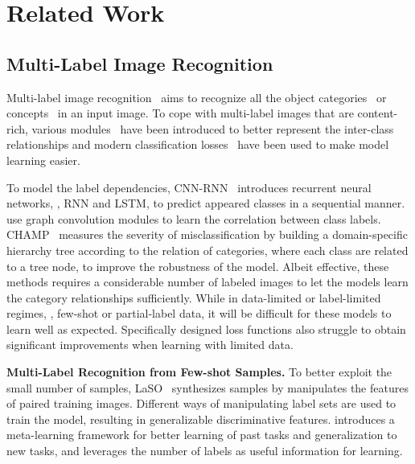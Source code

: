 \documentclass[10pt,twocolumn,letterpaper]{article}
\begin{document}
\section{Related Work}
\label{sec:relatedworks}

\subsection{Multi-Label Image Recognition}
Multi-label image recognition~\cite{ye2020add,benbaruch2020asymmetric,chen2019multi,chen2019multi2,guo2019multi,gao2020multi,zhang2018multilabel,he2018reinforced,wei2015hcp} aims to recognize all the object categories~\cite{coco,voc2007} or concepts~\cite{nuswide} in an input image.
To cope with multi-label images that are content-rich, various modules~\cite{wang2016cnn,chen2019learning} have been introduced to better represent the inter-class relationships and modern classification losses~\cite{benbaruch2020asymmetric,rankingloss} have been used to make model learning easier.

To model the label dependencies, CNN-RNN~\cite{wang2016cnn} introduces recurrent neural networks, \eg, RNN and LSTM, to predict appeared classes in a sequential manner. 
\cite{chen2019multi,chen2019learning,ye2020add,wang2020fast} use graph convolution modules to learn the correlation between class labels.
CHAMP~\cite{vaswani2022all} measures the severity of misclassification by building a domain-specific hierarchy tree according to the relation of categories, where each class are related to a tree node, to improve the robustness of the model.
Albeit effective, these methods requires a considerable number of labeled images to let the models learn the category relationships sufficiently. While in data-limited or label-limited regimes, \eg, few-shot or partial-label data, it will be difficult for these models to learn well as expected. 
Specifically designed loss functions also struggle to obtain significant improvements when learning with limited data.


\noindent \textbf{Multi-Label Recognition from Few-shot Samples.} To better exploit the small number of samples, LaSO~\cite{alfassy2019laso} synthesizes samples by manipulates the features of paired training images. 
Different ways of manipulating label sets are used to train the model, resulting in generalizable discriminative features. \cite{simon2022meta} introduces a meta-learning framework for better learning of past tasks and generalization to new tasks, and leverages the number of labels as useful information for learning.
\end{document}
